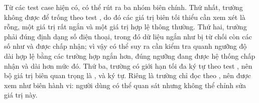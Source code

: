 Từ các test case hiện có, có thể rút ra ba nhóm biên chính. Thứ nhất, trường  không được để trống theo test , do đó các giá trị biên tối thiểu cần xem xét là rỗng, một giá trị rất ngắn và một giá trị hợp lệ thông thường. Thứ hai, trường  phải đúng định dạng số điện thoại, trong đó dữ liệu ngắn như  bị từ chối còn các số như  và  được chấp nhận; vì vậy có thể suy ra cần kiểm tra quanh ngưỡng độ dài hợp lệ bằng các trường hợp ngắn hơn, đúng ngưỡng đang được hệ thống chấp nhận và dài hơn mức đó. Thứ ba, trường  có giới hạn tối đa  ký tự theo test , nên bộ giá trị biên quan trọng là ,  và  ký tự. Riêng  là trường chỉ đọc theo , nên được xem như biên hành vi: người dùng có thể quan sát nhưng không thể chỉnh sửa giá trị này.

